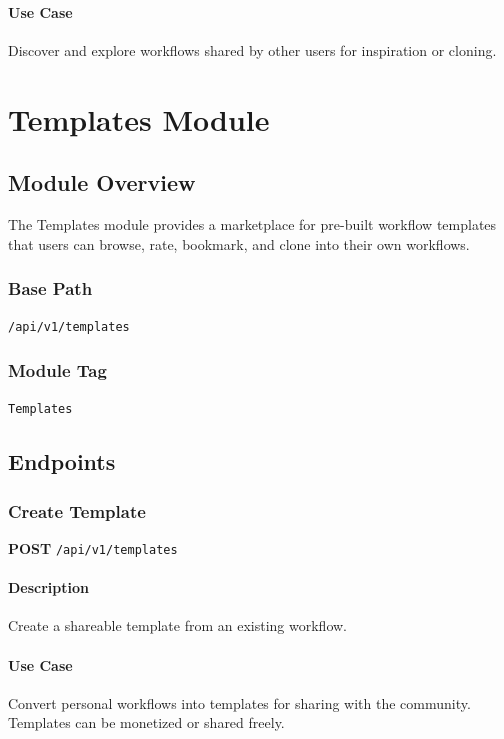 \documentclass[11pt,a4paper]{report}
\begin{document}
\subsubsection{Use Case}
Discover and explore workflows shared by other users for inspiration or cloning.

\newpage

\chapter{Templates Module}

\section{Module Overview}

The Templates module provides a marketplace for pre-built workflow templates that users can browse, rate, bookmark, and clone into their own workflows.

\subsection{Base Path}
\texttt{/api/v1/templates}

\subsection{Module Tag}
\texttt{Templates}

\section{Endpoints}

\subsection{Create Template}

\textbf{POST} \texttt{/api/v1/templates}

\subsubsection{Description}
Create a shareable template from an existing workflow.

\subsubsection{Use Case}
Convert personal workflows into templates for sharing with the community. Templates can be monetized or shared freely.
\end{document}
